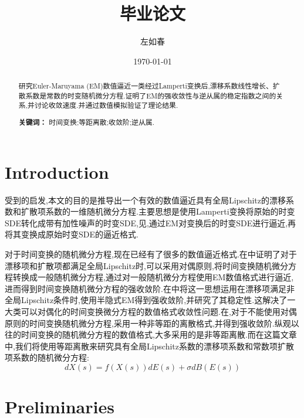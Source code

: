 \documentclass[12pt,final]{article}
\title{毕业论文}
\author{左如春}
\date{\today}
\numberwithin{equation}{section}
\numberwithin{figure}{section}
\numberwithin{table}{section}
\theoremstyle{plain}
\theoremstyle{Definition}
\theoremstyle{Remark}
\begin{document}
	
	\maketitle
	
	\begin{abstract}
		研究Euler-Maruyama (EM)数值逼近一类经过Lamperti变换后,漂移系数线性增长、扩散系数是常数的时变随机微分方程.证明了EM的强收敛性与逆从属的稳定指数之间的关系,并讨论收敛速度.并通过数值模拟验证了理论结果.
		
		\medskip
		\noindent\textbf{关键词：} 时间变换;等距离散;收敛阶;逆从属.
	\end{abstract}
	
	\section{Introduction}
	
	受到\cite{Alfonsi2013602}的启发,本文的目的是推导出一个有效的数值逼近具有全局Lipschitz的漂移系数和扩散项系数的一维随机微分方程.主要思想是使用Lamperti变换将原始的时变SDE转化成带有加性噪声的时变SDE,见\cite{iacus2008simulation},通过EM对变换后的时变SDE进行逼近,再将其变换成原始时变SDE的逼近格式.
	
	对于时间变换的随机微分方程,现在已经有了很多的数值逼近格式.在\cite{jum2014strong}中证明了对于漂移项和扩散项都满足全局Lipschitz时,可以采用对偶原则,将时间变换随机微分方程转换成一般随机微分方程,通过对一般随机微分方程使用EM数值格式进行逼近,进而得到时间变换随机微分方程的强收敛阶.在\cite{deng2020semi}中将这一思想运用在漂移项满足非全局Lipschitz条件时,使用半隐式EM得到强收敛阶,并研究了其稳定性.这解决了一大类可以对偶化的时间变换微分方程的数值格式收敛性问题.在\cite{jin2019strong},对于不能使用对偶原则的时间变换随机微分方程,采用一种非等距的离散格式,并得到强收敛阶.纵观以往的时间变换的随机微分方程的数值格式,大多采用的是非等距离散.而在这篇文章中,我们将使用等距离散来研究具有全局Lipschitz系数的漂移项系数和常数项扩散项系数的随机微分方程:
	\begin{equation}\label{basic SDE}
		dX(s)=f(X(s))dE(s)+\sigma dB(E(s))
	\end{equation}
	
	\section{Preliminaries}
	
\end{document}
